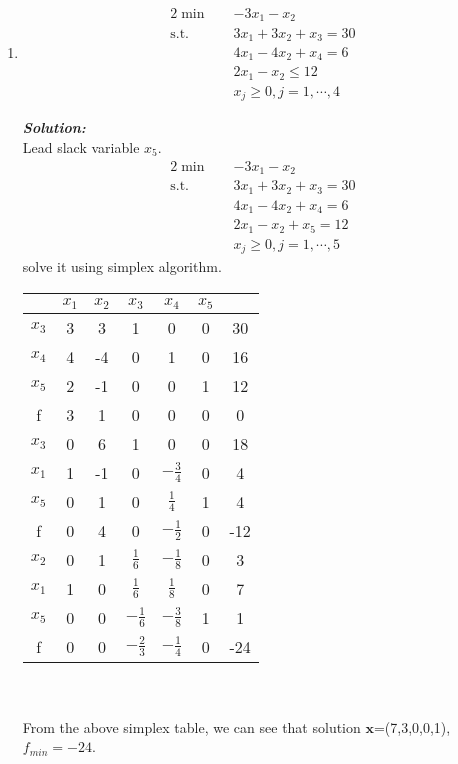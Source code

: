 \documentclass[paper=a4, fontsize=11pt]{scrartcl} %
\numberwithin{equation}{section} %
\numberwithin{figure}{section} %
\numberwithin{table}{section} %
\begin{document}
\begin{enumerate}
\item
\begin{alignat}{2}          \nonumber
\min\quad & -3x_1-x_2\\    \nonumber
\mbox{s.t.}\quad            \nonumber
& 3x_1+3x_2+x_3 = 30\\        \nonumber
& 4x_1-4x_2+x_4 = 6\\         \nonumber
& 2x_1-x_2 \leq 12\\          \nonumber
& x_j \geq 0, j=1,\cdots,4
\end{alignat}

\emph{\textbf{Solution:}}\\
Lead slack variable $x_5$.
\begin{alignat}{2}          \nonumber
\min\quad & -3x_1-x_2\\    \nonumber
\mbox{s.t.}\quad            \nonumber
& 3x_1+3x_2+x_3 = 30\\        \nonumber
& 4x_1-4x_2+x_4 = 6\\         \nonumber
& 2x_1-x_2+x_5 = 12\\          \nonumber
& x_j \geq 0, j=1,\cdots,5
\end{alignat}
solve it using simplex algorithm.\\
\begin{tabular}{|c|c|c|c|c|c|c|}
\hline &$x_1$&$x_2$&$x_3$&$x_4$&$x_5$&\\
\hline$x_3$&3&3&1&0&0&30\\
$x_4$&4&-4&0&1&0&16\\
$x_5$&2&-1&0&0&1&12\\
\hline f&3&1&0&0&0&0\\
\hline
\hline$x_3$&0&6&1&0&0&18\\
$x_1$&1&-1&0&$-\frac{3}{4}$&0&4\\
$x_5$&0&1&0&$\frac{1}{4}$&1&4\\
\hline f&0&4&0&$-\frac{1}{2}$&0&-12\\
\hline
\hline$x_2$&0&1&$\frac{1}{6}$&$-\frac{1}{8}$&0&3\\
$x_1$&1&0&$\frac{1}{6}$&$\frac{1}{8}$&0&7\\
$x_5$&0&0&$-\frac{1}{6}$&$-\frac{3}{8}$&1&1\\
\hline f&0&0&$-\frac{2}{3}$&$-\frac{1}{4}$&0&-24\\
\hline
\end{tabular}
\\\\
From the above simplex table, we can see that solution $\mathbf{x}$=(7,3,0,0,1),$f_{min}=-24$.
\end{enumerate}
\end{document}
